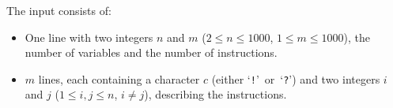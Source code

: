 
    The input consists of:
    \begin{itemize}
        \item One line with two integers $n$ and $m$ ($2 \leq n \leq 1000$, $1 \leq m \leq 1000$),
            the number of variables and the number of instructions.
        \item $m$ lines, each containing a character $c$ (either `\texttt{!}'~or~`\texttt{?}')
            and two integers $i$ and $j$ ($1 \leq i, j \leq n$, $i \neq j$), describing the instructions.
    \end{itemize}
